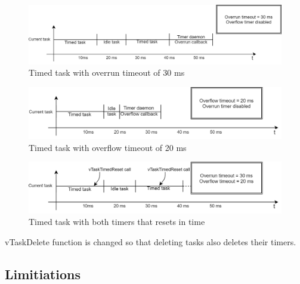 \begin{figure}[H]

      \centering
      \includegraphics[width=\linewidth]{images/timed_example_overrun.png}
      \caption{Timed task with overrun timeout of 30 ms}
      \label{fig:timed_example_overrun}
    
\end{figure}

\begin{figure}[H]

      \centering
      \includegraphics[width=\linewidth]{images/timed_example_overflow.png}
      \caption{Timed task with overflow timeout of 20 ms}
      \label{fig:timed_example_overflow}
    
\end{figure}

\begin{figure}[H]

      \centering
      \includegraphics[width=\linewidth]{images/timed_example_reset.png}
      \caption{Timed task with both timers that resets in time}
      \label{fig:timed_example_reset}
    
\end{figure}

vTaskDelete function is changed so that deleting tasks also deletes their timers.

\subsection{Limitiations}

